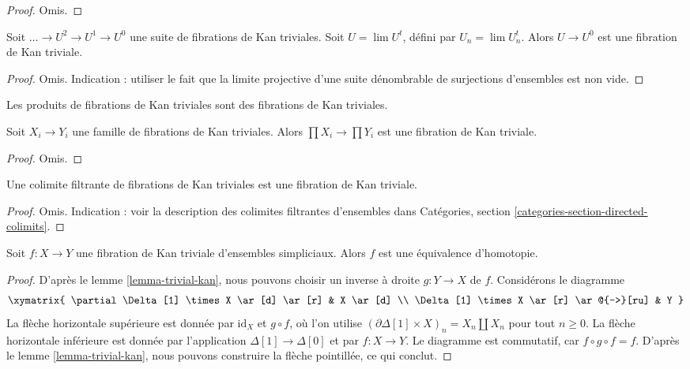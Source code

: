 \begin{proof}
Omis.
\end{proof}

\begin{lemma}
\label{lemma-limit-trivial-kan}
Soit $\ldots \to U^2 \to U^1 \to U^0$ une suite de fibrations de Kan
triviales. Soit $U = \lim U^t$, défini par $U_n = \lim U_n^t$.
Alors $U \to U^0$ est une fibration de Kan triviale.
\end{lemma}

\begin{proof}
Omis. Indication : utiliser le fait que la limite projective d'une suite
dénombrable de surjections d'ensembles est non vide.
\end{proof}

\begin{lemma}
\label{lemma-product-trivial-kan}
\begin{slogan}
Les produits de fibrations de Kan triviales sont des fibrations de Kan triviales.
\end{slogan}
Soit $X_i \to Y_i$ une famille de fibrations de Kan triviales. Alors
$\prod X_i \to \prod Y_i$ est une fibration de Kan triviale.
\end{lemma}

\begin{proof}
Omis.
\end{proof}

\begin{lemma}
\label{lemma-filtered-colimit-trivial-kan}
Une colimite filtrante de fibrations de Kan triviales est une fibration de Kan triviale.
\end{lemma}

\begin{proof}
Omis. Indication : voir la description des colimites filtrantes d'ensembles dans
Catégories, section \ref{categories-section-directed-colimits}.
\end{proof}

\begin{lemma}
\label{lemma-trivial-kan-homotopy}
Soit $f : X \to Y$ une fibration de Kan triviale d'ensembles simpliciaux.
Alors $f$ est une équivalence d'homotopie.
\end{lemma}

\begin{proof}
D'après le lemme \ref{lemma-trivial-kan}, nous pouvons choisir un inverse à
droite $g : Y \to X$ de $f$. Considérons le diagramme
$$
\xymatrix{
\partial \Delta[1] \times X \ar[d] \ar[r] & X \ar[d] \\
\Delta[1] \times X \ar[r] \ar@{-->}[ru] & Y
}
$$
La flèche horizontale supérieure est donnée par $\text{id}_X$ et $g \circ f$,
où l'on utilise
$(\partial \Delta[1] \times X)_n = X_n \amalg X_n$ pour tout $n \geq 0$.
La flèche horizontale inférieure est donnée par l'application
$\Delta[1] \to \Delta[0]$ et par $f : X \to Y$. Le diagramme est commutatif,
car $f \circ g \circ f = f$. D'après le lemme \ref{lemma-trivial-kan},
nous pouvons construire la flèche pointillée, ce qui conclut.
\end{proof}






